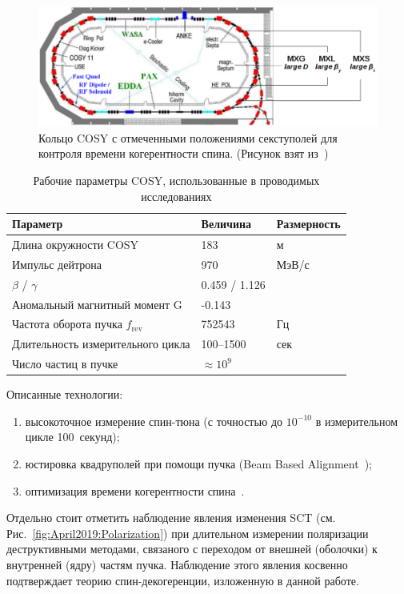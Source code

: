\begin{figure}[H]\centering
	\includegraphics[width=\linewidth]{images/chapter4/COSY-sextupoles}
	\caption{Кольцо COSY с отмеченными положениями секступолей для контроля времени когерентности спина. (Рисунок взят из~\cite{Guidoboni:STORI14})\label{fig:COSY_Ring}}
\end{figure}


\begin{table}[H]\centering
	\caption{Рабочие параметры COSY, использованные в проводимых исследованиях\label{tbl:COSY-studies}}
	\begin{tabular}{lll}
		\toprule
		Параметр & Величина & Размерность \\
		\midrule
		Длина окружности COSY& 183 & м\\
		Импульс дейтрона & 970 & МэВ/с \\
		$\beta$ / $\gamma$ & 0.459 / 1.126 & \\
		Аномальный магнитный момент G& -0.143& \\
		Частота оборота пучка $f_{\mathrm{rev}}$& 752543& Гц\\
		Длительность измерительного цикла& 100--1500& сек\\
		Число частиц в пучке & $\approx 10^9$& \\
		\bottomrule
	\end{tabular}
\end{table}

Описанные технологии:
\begin{enumerate}[(1)]
	\item высокоточное измерение спин-тюна (с точностью до $10^{-10}$ в измерительном цикле 100~секунд);
	\item юстировка квадруполей при помощи пучка (Beam Based Alignment~\cite{Wagner:BBA2018});
	\item оптимизация времени когерентности спина~\cite{COSY:SCT:IPAC15, Guidoboni:STORI14}.
\end{enumerate} 

Отдельно стоит отметить наблюдение явления изменения SCT (см. Рис.~\ref{fig:April2019:Polarization}) 
при длительном измерении поляризации деструктивными методами, связаного с переходом 
от внешней (оболочки) к внутренней (ядру) частям пучка. 
Наблюдение этого явления косвенно подтверждает теорию спин-декогеренции, изложенную в данной работе.

